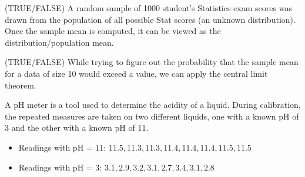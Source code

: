 \documentclass[addpoints]{examsetup}\usepackage[]{graphicx}\usepackage[]{color}
\begin{document}



\examCoverPage

\begin{questions}

\question[2]
(TRUE/FALSE) A random sample of 1000 student's Statistics exam scores was drawn from the population of all possible Stat scores (an unknown distribution).
Once the sample mean is computed, it can be viewed as the distribution/population mean.

\vspace{1cm}

\question[2]
(TRUE/FALSE) While trying to figure out the probability that the sample mean for a data of size 10 would exceed a value, we can apply the central limit theorem.

\vspace{1cm}

\question



A pH meter is a tool used to determine the acidity of a liquid. 
During calibration, the repeated measures are taken on two different liquids, one with a known pH of 3 and the other with a known pH of 11.

\begin{itemize}

   \item Readings with pH = 11: $ 11.5, 11.3, 11.3, 11.4, 11.4, 11.4, 11.5, 11.5 $ \\

   \item Readings with pH = 3: $ 3.1, 2.9, 3.2, 3.1, 2.7, 3.4, 3.1, 2.8 $ \\

\end{itemize}


\end{questions}
\end{document}
